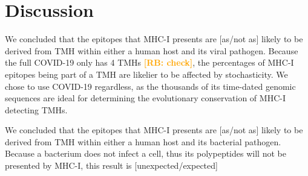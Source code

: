 \documentclass{article}
\newcommand{\frans}[1]{\textcolor{blue}{\textbf{[FB: #1]}}}
\newcommand{\richel}[1]{\textcolor{orange}{\textbf{[RB: #1]}}}
\begin{document}
\section{Discussion}

We concluded that the
epitopes that MHC-I presents are [as/not as] likely 
to be derived from TMH within either a human host and its viral pathogen.
Because the full COVID-19 only has 4 TMHs \richel{check}, the percentages
of MHC-I epitopes being part of a TMH are likelier to be affected by
stochasticity. We chose to use COVID-19 regardless, as the thousands
of its time-dated genomic sequences are ideal for determining the 
evolutionary conservation of MHC-I detecting TMHs. 

We concluded that the
epitopes that MHC-I presents are [as/not as] likely 
to be derived from TMH within either a human host and its bacterial pathogen.
Because a bacterium does not infect a cell, thus its polypeptides
will not be presented by MHC-I, this result is [unexpected/expected]


\end{document}
